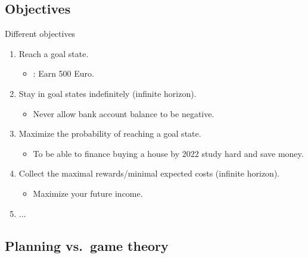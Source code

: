 \documentclass{gkibeamer}
\begin{document}
\subsection{Objectives}

\begin{frame}{Different objectives}
  \begin{enumerate}
  \item Reach a goal state.
    \begin{itemize}
    \item {}: Earn 500 Euro.
    \end{itemize}
  \item Stay in goal states indefinitely (infinite horizon).
    \begin{itemize}
    \item {} Never allow bank account balance to be
      negative.
    \end{itemize}
  \item Maximize the probability of reaching a goal state.
    \begin{itemize}
    \item {} To be able to finance buying a house by 2022
      study hard and save money.
    \end{itemize}
  \item Collect the maximal  rewards/minimal expected costs
    (infinite horizon).
    \begin{itemize}
    \item {} Maximize your future income.
    \end{itemize}
  \item ...
  \end{enumerate}
\end{frame}

\subsection{Planning vs.\ game theory}
\end{document}
